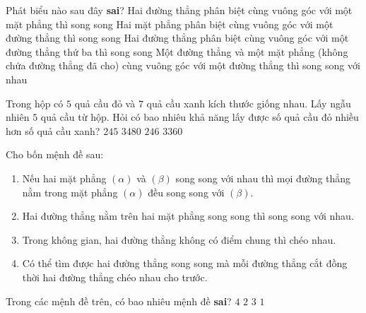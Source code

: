 \begin{ex}%
Phát biểu nào sau đây \textbf{sai}?
	\choice
	{Hai đường thẳng phân biệt cùng vuông góc với một mặt phẳng thì song song}
	{Hai mặt phẳng phân biệt cùng vuông góc với một đường thẳng thì song song}
	{\True Hai đường thẳng phân biệt cùng vuông góc với một đường thẳng thứ ba thì song song}
	{Một đường thẳng và một mặt phẳng (không chứa đường thẳng đã cho) cùng vuông góc với một đường thẳng thì song song với nhau}
\loigiai{
}	
\end{ex}

\begin{ex}%
Trong hộp có $5$ quả cầu đỏ và $7$ quả cầu xanh kích thước giống nhau. Lấy ngẫu nhiên $5$ quả cầu từ hộp. Hỏi có bao nhiêu khả năng lấy được số quả cầu đỏ nhiều hơn số quả cầu xanh?
	\choice
	{$245$}
	{$3480$}
	{\True $246$}
	{$3360$}
\end{ex}

\begin{ex}%
Cho bốn mệnh đề sau:
\begin{enumerate}
\item Nếu hai mặt phẳng $(\alpha)$ và $(\beta)$ song song với nhau thì mọi đường thẳng nằm trong mặt phẳng $(\alpha)$ đều song song với $(\beta)$.
\item Hai đường thẳng nằm trên hai mặt phẳng song song thì song song với nhau.
\item Trong không gian, hai đường thẳng không có điểm chung thì chéo nhau.
\item Có thể tìm được hai đường thẳng song song mà mỗi đường thẳng cắt đồng thời hai đường thẳng chéo nhau cho trước.
\end{enumerate}
Trong các mệnh đề trên, có bao nhiêu mệnh đề \textbf{sai}?
	\choice
	{$4$}
	{$2$}
	{\True $3$}
	{$1$}
\end{ex}

